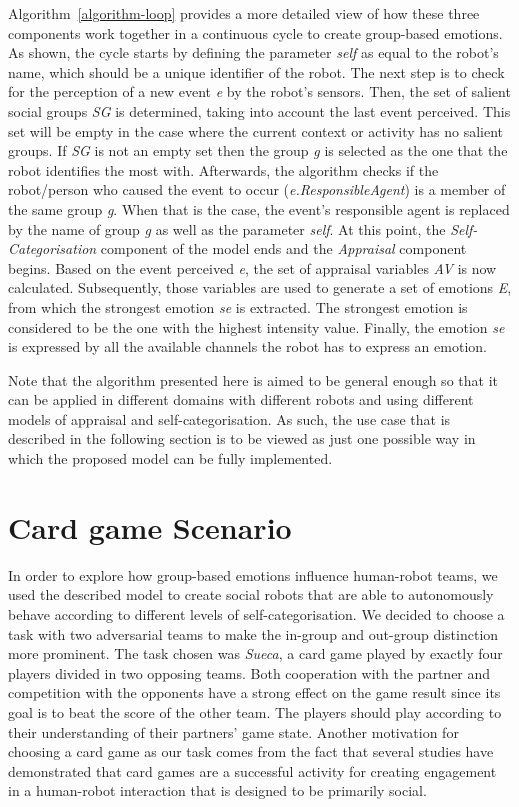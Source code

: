 Algorithm~\ref{algorithm-loop} provides a more detailed view of how these three components work together in a continuous cycle to create group-based emotions. As shown, the cycle starts by defining the parameter \textit{self} as equal to the robot's name, which should be a unique identifier of the robot. The next step is to check for the perception of a new event \textit{e} by the robot's sensors. Then, the set of salient social groups \textit{SG} is determined, taking into account the last event perceived. This set will be empty in the case where the current context or activity has no salient groups. If \textit{SG} is not an empty set then the group \textit{g} is selected as the one that the robot identifies the most with. Afterwards, the algorithm checks if the robot/person who caused the event to occur (\textit{e.ResponsibleAgent})  is a member of the same group \textit{g}. When that is the case, the event's responsible agent is replaced by the name of group \textit{g} as well as the parameter \textit{self}. At this point, the \textit{Self-Categorisation} component of the model ends and the \textit{Appraisal} component begins. Based on the event perceived \textit{e}, the set of appraisal variables \textit{AV} is now calculated. Subsequently, those variables are used to generate a set of emotions \textit{E}, from which the strongest emotion \textit{se} is extracted. The strongest emotion is considered to be the one with the highest intensity value. Finally, the emotion \textit{se} is expressed by all the available channels the robot has to express an emotion. 

Note that the algorithm presented here is aimed to be general enough so that it can be applied in different domains with different robots and using different models of appraisal and self-categorisation. As such, the use case that is described in the following section is to be viewed as just one possible way in which the proposed model can be fully implemented.

\section{Card game Scenario}
\label{sec:model-implementation}
In order to explore how group-based emotions influence human-robot teams, we used the described model to create social robots that are able to autonomously behave according to different levels of self-categorisation. We decided to choose a task with two adversarial teams to make the in-group and out-group distinction more prominent. The task chosen was \textit{Sueca}, a card game played by exactly four players divided in two opposing teams. Both cooperation with the partner and competition with the opponents have a strong effect on the game result since its goal is to beat the score of the other team. The players should play according to their understanding of their partners' game state. Another motivation for choosing a card game as our task comes from the fact that several studies \cite{ng2008memory,haring2014would,mccoll2013brian,shahid2014child} have demonstrated that card games are a successful activity for creating engagement in a human-robot interaction that is designed to be primarily social.


